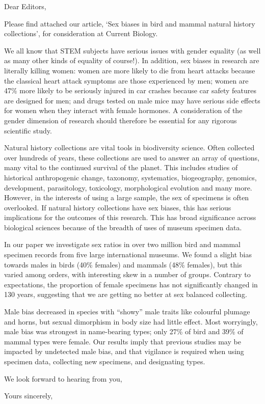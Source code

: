 \documentclass[11pt]{letter}
\begin{document}
\begin{letter}{}
\opening{Dear Editors,}

Please find attached our article, `Sex biases in bird and mammal natural history collections', for consideration at Current Biology.

We all know that STEM subjects have serious issues with gender equality (as well as many other kinds of equality of course!). In addition, sex biases in research are literally killing women: women are more likely to die from heart attacks because the classical heart attack symptoms are those experienced by men; women are 47\% more likely to be seriously injured in car crashes because car safety features are designed for men; and drugs tested on male mice may have serious side effects for women when they interact with female hormones. A consideration of the gender dimension of research should therefore be essential for any rigorous scientific study.

Natural history collections are vital tools in biodiversity science. Often collected over hundreds of years, these collections are used to answer an array of questions, many vital to the continued survival of the planet. This includes studies of historical anthropogenic change, taxonomy, systematics, biogeography, genomics, development, parasitology, toxicology, morphological evolution and many more. However, in the interests of using a large sample, the sex of specimens is often overlooked. If natural history collections have sex biases, this has serious implications for the outcomes of this research. This has broad significance across biological sciences because of the breadth of uses of museum specimen data. 

In our paper we investigate sex ratios in over two million bird and mammal specimen records from five large international museums. We found a slight bias towards males in birds (40\% females) and mammals (48\% females), but this varied among orders, with interesting skew in a number of groups. Contrary to expectations, the proportion of female specimens has not significantly changed in 130 years, suggesting that we are getting no better at sex balanced collecting.

Male bias decreased in species with ``showy'' male traits like colourful plumage and horns, but  sexual dimorphism in body size had little effect. Most worryingly, male bias was strongest in name-bearing types; only 27\% of bird and 39\% of mammal types were female. Our results imply that previous studies may be impacted by undetected male bias, and that vigilance is required when using specimen data, collecting new specimens, and designating types. 
 
We look forward to hearing from you,


\closing{Yours sincerely,}


\end{letter}
\end{document}
